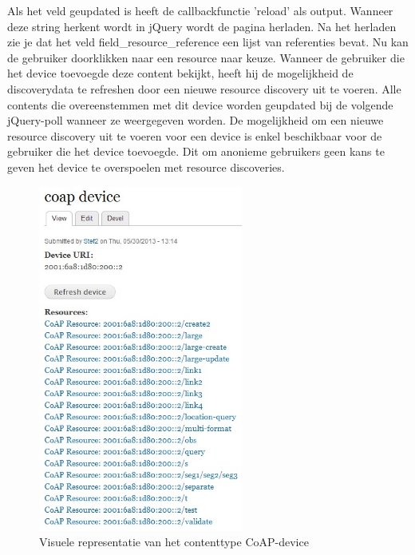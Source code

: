Als het veld geupdated is heeft de callbackfunctie 'reload' als output. Wanneer deze string herkent wordt in jQuery wordt de pagina herladen. Na het herladen zie je dat het veld field\_resource\_reference een lijst van referenties bevat. Nu kan de gebruiker doorklikken naar een resource naar keuze. Wanneer de gebruiker die het device toevoegde deze content bekijkt, heeft hij de mogelijkheid de discoverydata te refreshen door een nieuwe resource discovery uit te voeren. Alle contents die overeenstemmen met dit device worden geupdated bij de volgende jQuery-poll wanneer ze weergegeven worden. De mogelijkheid om een nieuwe resource discovery uit te voeren voor een device is enkel beschikbaar voor de gebruiker die het device toevoegde. Dit om anonieme gebruikers geen kans te geven het device te overspoelen met resource discoveries.
\begin{figure}[h!]
\centering
\includegraphics[width=0.6\textwidth]{fig/coap_device}
\caption{Visuele representatie van het contenttype CoAP-device}
\label{fig:coapDevice}
\end{figure}



